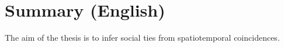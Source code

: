 \chapter{Summary (English)}

The aim of the thesis is to infer social ties from spatiotemporal coincidences.  
